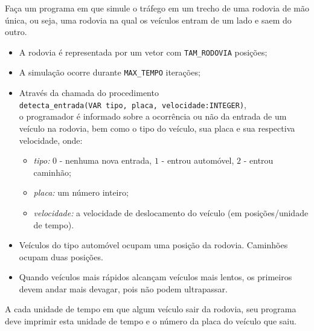 \item Faça um programa em  que simule o 
tráfego em um trecho de uma rodovia de mão única, ou seja, uma rodovia na 
qual os veículos entram de um lado e saem do outro. 

\begin{itemize}
    \item A rodovia é representada por um vetor com \verb|TAM_RODOVIA| posições;
    \item A simulação ocorre durante \verb|MAX_TEMPO| iterações;
    \item Através da chamada do procedimento \\
          \verb|detecta_entrada(VAR tipo, placa, velocidade:INTEGER)|,\\
          o programador é 
          informado sobre a ocorrência ou não da entrada de um veículo na
          rodovia, bem como o tipo do veículo, sua placa e sua respectiva 
          velocidade, onde:
        \begin{itemize}
            \item \emph{tipo:} $0$ - nenhuma nova entrada, 
                               $1$ - entrou automóvel, 
                               $2$ - entrou caminhão;
            \item \emph{placa:} um número inteiro;
            \item \emph{velocidade:} a velocidade de deslocamento do veículo 
                   (em posições/unidade de tempo).
        \end{itemize}
    \item Veículos do tipo automóvel ocupam uma posição da rodovia. 
          Caminhões ocupam duas posições.
    \item Quando veículos mais rápidos alcançam veículos mais lentos, os 
          primeiros devem andar mais devagar, pois não podem ultrapassar.
\end{itemize}    
    

A cada unidade de tempo em que algum veículo sair da rodovia, seu programa
deve imprimir esta unidade de tempo e o número da placa do veículo que saiu.

